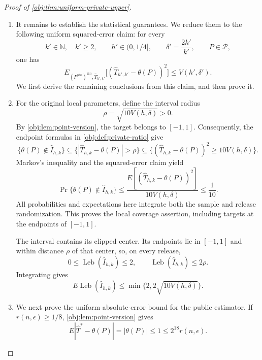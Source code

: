 \documentclass[11pt]{article}
\begin{document}
\begin{proof}[Proof of \cref{obj:thm:uniform-private-upper}]
\begin{enumerate}
\item
It remains to establish the statistical guarantees. We reduce them to the following uniform squared-error claim: for every
\[
k'\in\mathbb N,\quad k'\ge2,
\qquad
h'\in(0,1/4],
\qquad
\delta'=\frac{2h'}{k'},
\qquad
P\in\mathcal P,
\]
one has
\[
E_{(P^{\mathrm{obs}})^{\otimes n},\widehat T_{h',k'}}
\bigl[(\widehat T_{h',k'}-\theta(P))^2\bigr]
\le V(h',\delta').
\]
We first derive the remaining conclusions from this claim, and then prove it.

\item
For the original local parameters, define the interval radius
\[
\rho=\sqrt{10V(h,\delta)}>0.
\]
By \cref{obj:lem:point-version}, the target belongs to \([-1,1]\). Consequently, the endpoint formulas in \cref{obj:def:private-ratio} give
\[
\{\theta(P)\notin\widehat I_{h,k}\}
\subseteq
\{|\widehat T_{h,k}-\theta(P)|>\rho\}
\subseteq
\{(\widehat T_{h,k}-\theta(P))^2\ge10V(h,\delta)\}.
\]
Markov's inequality and the squared-error claim yield
\[
\Pr\{\theta(P)\notin\widehat I_{h,k}\}
\le
\frac{
E[(\widehat T_{h,k}-\theta(P))^2]
}{10V(h,\delta)}
\le\frac1{10}.
\]
All probabilities and expectations here integrate both the sample and release randomization. This proves the local coverage assertion, including targets at the endpoints of \([-1,1]\).

The interval contains its clipped center. Its endpoints lie in \([-1,1]\) and within distance \(\rho\) of that center, so, on every release,
\[
0\le\operatorname{Leb}(\widehat I_{h,k})
\le2,
\qquad
\operatorname{Leb}(\widehat I_{h,k})\le2\rho.
\]
Integrating gives
\[
E\operatorname{Leb}(\widehat I_{h,k})
\le\min\{2,2\sqrt{10V(h,\delta)}\}.
\]

\item
We next prove the uniform absolute-error bound for the public estimator. If \(r(n,\epsilon)\ge1/8\), \cref{obj:lem:point-version} gives
\[
E|\widehat T^*-\theta(P)|
=|\theta(P)|
\le1
\le2^{18}r(n,\epsilon).
\]


\end{enumerate}
\end{proof}
\end{document}
